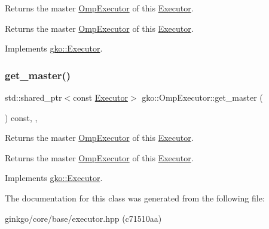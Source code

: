 Returns the master \hyperlink{classgko_1_1OmpExecutor}{Omp\+Executor} of this \hyperlink{classgko_1_1Executor}{Executor}. 

\begin{DoxyReturn}{Returns}
the master \hyperlink{classgko_1_1OmpExecutor}{Omp\+Executor} of this \hyperlink{classgko_1_1Executor}{Executor}. 
\end{DoxyReturn}


Implements \hyperlink{classgko_1_1Executor_acaec4f999d52fc71e5e5a3d3ad93609c}{gko\+::\+Executor}.

\mbox{\label{classgko_1_1OmpExecutor_ab297a7eba78463784d4d2ca08b03c675}} 
\subsubsection{\texorpdfstring{get\+\_\+master()}{get\_master()}\hspace{0.1cm}{\footnotesize\ttfamily [2/2]}}
{\footnotesize\ttfamily std\+::shared\+\_\+ptr$<$const \hyperlink{classgko_1_1Executor}{Executor}$>$ gko\+::\+Omp\+Executor\+::get\+\_\+master (\begin{DoxyParamCaption}{ }\end{DoxyParamCaption}) const\hspace{0.3cm}{\ttfamily [override]}, {\ttfamily [virtual]}, {\ttfamily [noexcept]}}



Returns the master \hyperlink{classgko_1_1OmpExecutor}{Omp\+Executor} of this \hyperlink{classgko_1_1Executor}{Executor}. 

\begin{DoxyReturn}{Returns}
the master \hyperlink{classgko_1_1OmpExecutor}{Omp\+Executor} of this \hyperlink{classgko_1_1Executor}{Executor}. 
\end{DoxyReturn}


Implements \hyperlink{classgko_1_1Executor_a261386e439c8daa6e0d95dc331b9bfeb}{gko\+::\+Executor}.



The documentation for this class was generated from the following file\+:\begin{DoxyCompactItemize}
\item 
ginkgo/core/base/executor.\+hpp (c71510aa)\end{DoxyCompactItemize}
